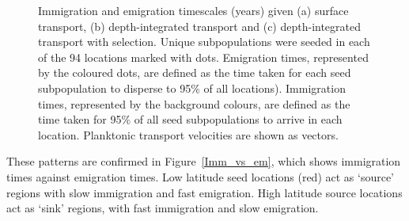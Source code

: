 \documentclass[12pt]{article}
\begin{document}
\begin{figure}[htp]
        \centering
\begin{subfigure}{.66\textwidth}
        \centering
    \end{subfigure}%
\\
\begin{subfigure}{.66\textwidth}
        \centering
    \end{subfigure}%
    \\
\begin{subfigure}{.66\textwidth}
        \centering
    \end{subfigure}%
    \\~\\
\begin{subfigure}{.66\textwidth}
        \centering
    \end{subfigure}%
    \\
    \caption{Immigration and emigration timescales (years) given (a) surface transport, (b) depth-integrated transport and (c) depth-integrated transport with selection. Unique subpopulations were seeded in each of the 94 locations marked with dots. Emigration times, represented by the coloured dots, are defined as the time taken for each seed subpopulation to disperse to 95\% of all locations). Immigration times, represented by the background colours, are defined as the time taken for 95\% of all seed subpopulations to arrive in each location. Planktonic transport velocities are shown as vectors.}
\label{Connectivity_maps}
\end{figure}


These patterns are confirmed in Figure~\ref{Imm_vs_em}, which shows immigration times against emigration times. Low latitude seed locations (red) act as `source' regions with slow immigration and fast emigration. High latitude source locations act as `sink' regions, with fast immigration and slow emigration.
\end{document}
